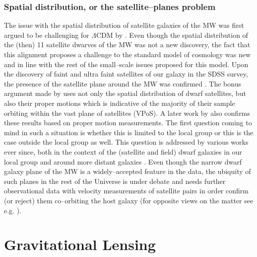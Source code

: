 \documentclass[a4wide,12pt]{book}
\begin{document}
{\subsection{Spatial distribution, or the satellite--planes problem}
The issue with the spatial distribution of satellite galaxies of the MW was first argued to be challenging for $\Lambda$CDM by \citet[][]{Kroupa+2005}. Even though the spatial distribution of the (then) 11 satellite dwarves of the MW was not a new discovery, the fact that this alignment proposes a challenge to the standard model of cosmology was new and in line with the rest of the small--scale issues proposed for this model. Upon the discovery of faint and ultra faint satellites of our galaxy in the SDSS survey, the presence of the satellite plane around the MW was confirmed \citep[][]{Metz+2009, Kroupa+2010}. The bonus argument made by \citet[][]{Metz+2009} uses not only the spatial distribution of dwarf satellites, but also their proper motions which is indicative of the majority of their sample orbiting within the vast plane of satellites (VPoS). A later work by \citet[][]{Pawlowski+2013} also confirms these results based on proper motion measurements. The first question coming to mind in such a situation is whether this is limited to the local group or this is the case outside the local group as well. This question is addressed by various works ever since, both in the context of the (satellite and field) dwarf galaxies in our local group \citep[see e.g. ][]{Ibata+2013, Pawlowski+2013, Bellazzini+2013, Pawlowski.McGaugh2014} and around more distant galaxies \citep[see e.g. ][]{Tully+2015, Muller+2015}. Even though the narrow dwarf galaxy plane of the MW is a widely--accepted feature in the data, the ubiquity of such planes in the rest of the Universe is under debate and needs further observational data with velocity measurements of satellite pairs in order confirm (or reject) them co--orbiting the host galaxy (for opposite views on the matter see e.g. \citealt[][]{Phillips+2015, Cautun+2015}).


\chapter{Gravitational Lensing}
\label{sec:Gravitational lensing}

}
\end{document}

